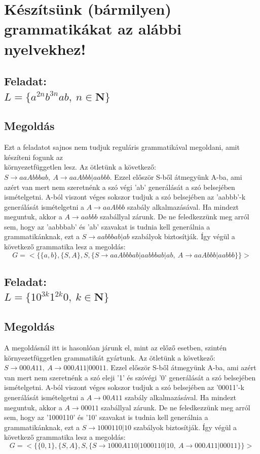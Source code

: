 \documentclass[12pt]{article}
\begin{document}
\section{Készítsünk (bármilyen) grammatikákat az alábbi nyelvekhez!}
\subsection{Feladat: \\
$ L=\{ a^{2n}b^{3n}ab, \ n \in \mathbf{N} \} $}
\maketitle
\subsection{Megoldás}
Ezt a feladatot sajnos nem tudjuk reguláris grammatikával megoldani, amit készíteni fogunk az \\
környezetfüggetlen lesz. Az ötletünk a következő: $ S \rightarrow aaAbbbab, \ A \rightarrow aaAbbb|aabbb $.
Ezzel először S-ből átmegyünk A-ba, ami azért van mert nem szeretnénk a szó végi 'ab' generálását a szó
belsejében ismételgetni. A-ból viszont véges sokszor tudjuk a szó belsejében az 'aabbb'-k generálását
ismételgetni a $ A \rightarrow aaAbbb $ szabály alkalmazásával. Ha mindezt meguntuk, akkor
a $ A \rightarrow aabbb $ szabállyal zárunk. De ne feledkezzünk meg arról sem, hogy az 'aabbbab' és 'ab'
szavakat is tudnia kell generálnia a grammatikánknak, ezt a $ S \rightarrow aabbbab|ab $ szabályok biztosítják.
Így végül a következő grammatika lesz a megoldás:
$$ G=<\{ \{a,b \}, \{S,A \}, S, \{ S \rightarrow aaAbbbab|aabbbab|ab, \ A \rightarrow aaAbbb|aabbb \} \}> $$

\subsection{Feladat: \\
$ L=\{ 10^{3k}1^{2k}0, \ k \in \mathbf{N} \} $}
\maketitle
\subsection{Megoldás}
A megoldásnál itt is hasonlóan járunk el, mint az előző esetben, szintén környezetfüggetlen grammatikát gyártunk.
Az ötletünk a következő: $ S \rightarrow 000A11, \ A \rightarrow 000A11|00011 $.
Ezzel először S-ből átmegyünk A-ba, ami azért van mert nem szeretnénk a szó eleji '1' és szóvégi '0' 
generálását a szó belsejében ismételgetni. A-ból viszont véges sokszor tudjuk a szó belsejében az '00011'-k
generálását ismételgetni a $ A \rightarrow 00A11 $ szabály alkalmazásával. Ha mindezt meguntuk, akkor
a $ A \rightarrow 00011 $ szabállyal zárunk. De ne feledkezzünk meg arról sem, hogy az '1000110' és '10'
szavakat is tudnia kell generálnia a grammatikánknak, ezt a $ S \rightarrow 1000110|10 $ szabályok biztosítják.
Így végül a következő grammatika lesz a megoldás:
$$ G=<\{ \{0,1 \}, \{S,A \}, S, \{ S \rightarrow 1000A110|1000110|10, \ A \rightarrow 000A11|00011 \} \}> $$
\end{document}
